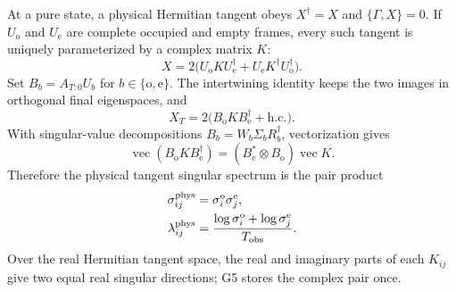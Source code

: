 \documentclass[aps,prx,twocolumn,superscriptaddress,longbibliography,nofootinbib,floatfix]{revtex4-2}
\newcommand{\Occ}{\mathrm{o}}
\newcommand{\Emp}{\mathrm{e}}
\begin{document}
At a pure state, a physical Hermitian tangent obeys $X^\dagger=X$ and
$\{\Gamma,X\}=0$.  If $U_{\Occ}$ and $U_{\Emp}$ are complete occupied and
empty frames, every such tangent is uniquely parameterized by a complex matrix $K$:
\begin{equation}
 X=2\bigl(U_{\Occ}KU_{\Emp}^\dagger
          +U_{\Emp}K^\dagger U_{\Occ}^\dagger\bigr).
 \label{eq:pure-tangent}
\end{equation}
Set $B_b=A_{T:0}U_b$ for $b\in\{\Occ,\Emp\}$.  The intertwining identity keeps
the two images in orthogonal final eigenspaces, and
\begin{equation}
 X_T=2\bigl(B_{\Occ}KB_{\Emp}^\dagger+\mathrm{h.c.}\bigr).
 \label{eq:evolved-tangent}
\end{equation}
With singular-value decompositions
$B_b=W_b\Sigma_bR_b^\dagger$, vectorization gives
\begin{equation}
 \operatorname{vec}(B_{\Occ}KB_{\Emp}^\dagger)
 =(B_{\Emp}^{*}\otimes B_{\Occ})\operatorname{vec}K.
 \label{eq:vec}
\end{equation}
Therefore the physical tangent singular spectrum is the pair product
\begin{align}
 \sigma_{ij}^{\rm phys}&=\sigma_i^{\Occ}\sigma_j^{\Emp},\nonumber\\
 \lambda_{ij}^{\rm phys}
 &=\frac{\log\sigma_i^{\Occ}+\log\sigma_j^{\Emp}}{T_{\rm obs}}.
 \label{eq:pair-rates}
\end{align}
Over the real Hermitian tangent space, the real and imaginary parts of each $K_{ij}$
give two equal real singular directions; G5 stores the complex pair once.
\end{document}
